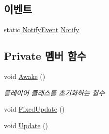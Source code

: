 \subsection*{이벤트}
\begin{DoxyCompactItemize}
\item 
static \mbox{\hyperlink{class_player_controller_a934c7f80b80276620cd60eaaeea7520e}{Notify\+Event}} \mbox{\hyperlink{class_player_controller_af13292e01756741118500035511fc88d}{Notify}}
\end{DoxyCompactItemize}
\subsection*{Private 멤버 함수}
\begin{DoxyCompactItemize}
\item 
void \mbox{\hyperlink{class_player_controller_a050967f0e5c2340cb21861e4c8c788a1}{Awake}} ()
\begin{DoxyCompactList}\small\item\em 플레이어 클래스를 초기화하는 함수 \end{DoxyCompactList}\item 
void \mbox{\hyperlink{class_player_controller_ae5bdb1b48571f67c3f722a58b6f404d4}{Fixed\+Update}} ()
\item 
void \mbox{\hyperlink{class_player_controller_ae8bc83dffb99867a04be016473ed2c43}{Update}} ()
\end{DoxyCompactItemize}
